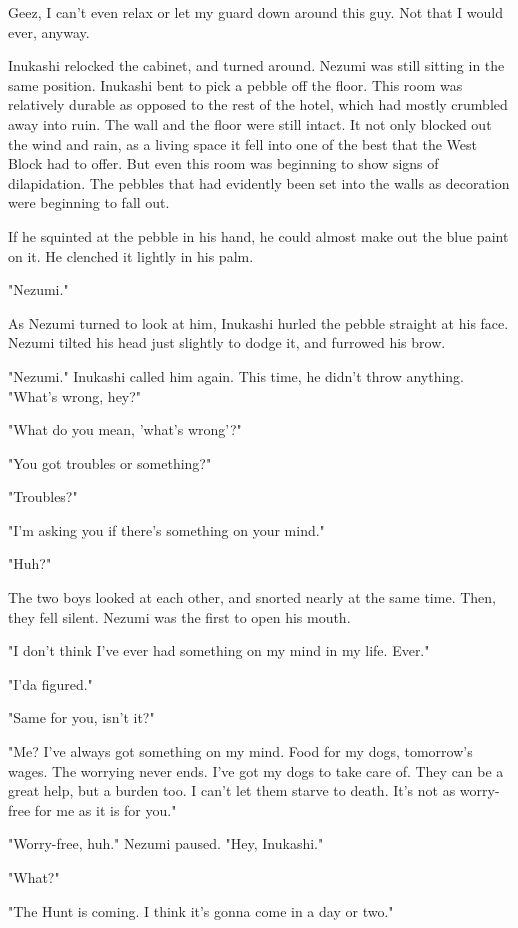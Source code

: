 Geez, I can't even relax or let my guard down around this guy. Not that
I would ever, anyway.

Inukashi relocked the cabinet, and turned around. Nezumi was still
sitting in the same position. Inukashi bent to pick a pebble off the
floor. This room was relatively durable as opposed to the rest of the
hotel, which had mostly crumbled away into ruin. The wall and the floor
were still intact. It not only blocked out the wind and rain, as a
living space it fell into one of the best that the West Block had to
offer. But even this room was beginning to show signs of dilapidation.
The pebbles that had evidently been set into the walls as decoration
were beginning to fall out.

If he squinted at the pebble in his hand, he could almost make out the
blue paint on it. He clenched it lightly in his palm.

"Nezumi."

As Nezumi turned to look at him, Inukashi hurled the pebble straight at
his face. Nezumi tilted his head just slightly to dodge it, and furrowed
his brow.

"Nezumi." Inukashi called him again. This time, he didn't throw
anything. "What's wrong, hey?"

"What do you mean, 'what's wrong'?"

"You got troubles or something?"

"Troubles?"

"I'm asking you if there's something on your mind."~

"Huh?"

The two boys looked at each other, and snorted nearly at the same time.
Then, they fell silent. Nezumi was the first to open his mouth.

"I don't think I've ever had something on my mind in my life. Ever."

"I'da figured."

"Same for you, isn't it?"

"Me? I've always got something on my mind. Food for my dogs, tomorrow's
wages. The worrying never ends. I've got my dogs to take care of. They
can be a great help, but a burden too. I can't let them starve to death.
It's not as worry-free for me as it is for you."

"Worry-free, huh." Nezumi paused. "Hey, Inukashi."

"What?"

"The Hunt is coming. I think it's gonna come in a day or two."


